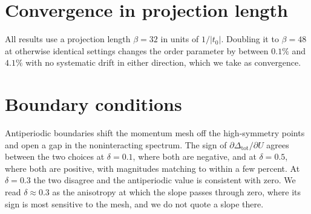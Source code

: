 \documentclass[aps,prb,reprint,superscriptaddress,amsmath,amssymb,floatfix]{revtex4-2}
\begin{document}
\section{Convergence in projection length}
\label{app:beta}

All results use a projection length $\beta = 32$ in units of $1/|t_0|$. Doubling
it to $\beta = 48$ at otherwise identical settings changes the order parameter by
between $0.1\%$ and $4.1\%$ with no systematic drift in either direction, which we
take as convergence.

\section{Boundary conditions}
\label{app:bc}

Antiperiodic boundaries shift the momentum mesh off the high-symmetry points and
open a gap in the noninteracting spectrum. The sign of
$\partial \Delta_{\mathrm{tot}} / \partial U$ agrees between the two choices at
$\delta = 0.1$, where both are negative, and at $\delta = 0.5$, where both are
positive, with magnitudes matching to within a few percent. At $\delta = 0.3$ the
two disagree and the antiperiodic value is consistent with zero. We read
$\delta \approx 0.3$ as the anisotropy at which the slope passes through zero,
where its sign is most sensitive to the mesh, and we do not quote a slope there.

\begin{acknowledgments}
\end{acknowledgments}
\end{document}
